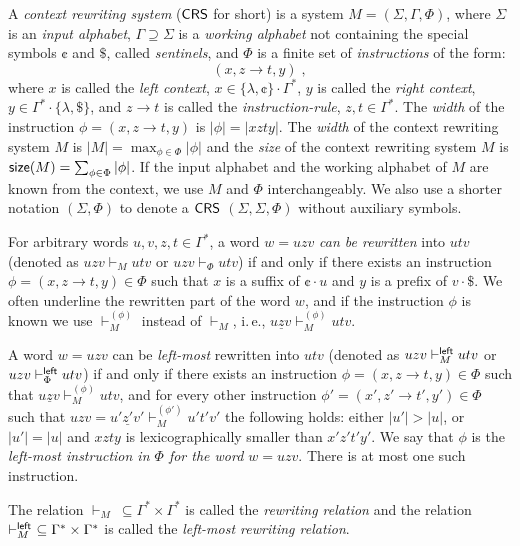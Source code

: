 \begin{definition}\label{definition:crs}
A \emph{context rewriting system} (\emph{$\textup{\sf CRS\/}$} for short) is a system $M = (\Sigma, \Gamma, \Phi)$, where $\Sigma$ is an \emph{input alphabet}, $\Gamma \supseteq \Sigma$ is a \emph{working alphabet} not containing the special symbols $\cent$ and $\$$, called \emph{sentinels}, and $\Phi$ is a finite set of \emph{instructions} of the form:
$$(x, z \to t, y)\;,$$
where $x$ is called the \emph{left context}, $x \in \{\lambda, \cent\}\cdot\Gamma^*$,
$y$ is called the \emph{right context}, $y \in \Gamma^*\cdot\{\lambda, \$\}$, and
$z \to t$ is called the \emph{instruction-rule}, $z, t \in \Gamma^*$.
The \emph{width} of the instruction $\phi = (x, z \to t, y)$ is $|\phi| = |xzty|$. The \emph{width} of the context rewriting system $M$ is $|M| = \max_{\phi \in \Phi} |\phi|$ and the \emph{size} of the context rewriting system $M$ is $\textup{\sf size}(M) = \sum_{\phi \in \Phi} |\phi|$. If the input alphabet and the working alphabet of $M$ are known from the context, we use $M$ and $\Phi$ interchangeably. We also use a shorter notation $(\Sigma, \Phi)$ to denote a $\textup{\sf CRS\/}$ $(\Sigma, \Sigma, \Phi)$ without auxiliary symbols.

For arbitrary words $u, v, z, t \in \Gamma^*$, a word $w = uzv$ \emph{can be rewritten} into $utv$ (denoted as $uzv \vdash_M utv$ or $uzv \vdash_{\Phi} utv$) if and only if there exists an instruction $\phi = (x, z \to t, y) \in \Phi$ such that $x$ is a suffix of $\cent \cdot u$ and $y$ is a prefix of $v \cdot \$ $. We often underline the rewritten part of the word $w$, and if the instruction $\phi$ is known we use $\vdash^{(\phi)}_M$ instead of $\vdash_M$, i.\,e., $u \underline{z} v \vdash^{(\phi)}_M utv$.

A word $w = uzv$ can be \emph{left-most} rewritten into $utv$ (denoted as $uzv \vdash^{\sf left}_M utv$ or $uzv \vdash^{\sf left}_{\Phi} utv$) if and only if there exists an instruction $\phi = (x, z \to t, y) \in \Phi$ such that $u \underline{z} v \vdash^{(\phi)}_M utv$, and for every other instruction $\phi' = (x', z' \to t', y') \in \Phi$ such that $uzv = u' \underline{z'} v' \vdash^{(\phi')}_M u't'v'$ the following holds: either $|u'| > |u|$, or $|u'| = |u|$ and $xzty$ is lexicographically smaller than $x'z't'y'$. We say that $\phi$ is the \emph{left-most instruction in $\Phi$ for the word $w = uzv$}. There is at most one such instruction.

The relation $\vdash_M \ \subseteq \Gamma^* \times \Gamma^*$ is called the \emph{rewriting relation} and the relation $\vdash^{\sf left}_M \ \subseteq \Gamma^* \times \Gamma^*$ is called the \emph{left-most rewriting relation}.


\end{definition}
